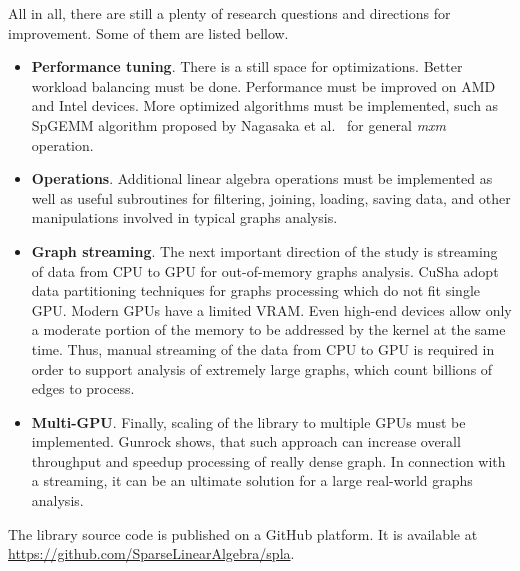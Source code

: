 All in all, there are still a plenty of research questions and directions for improvement. Some of them are listed bellow.

\begin{itemize}
    \item \textbf{Performance tuning}. There is a still space for optimizations. Better workload balancing must be done. Performance must be improved on AMD and Intel devices. More optimized algorithms must be implemented, such as SpGEMM  algorithm proposed by Nagasaka et al.~\cite{inproceedings:spgemm_mem_saving_for_nvidia} for general \textit{mxm} operation.
   
    \item \textbf{Operations}. Additional linear algebra operations must be implemented as well as useful subroutines for filtering, joining, loading, saving data, and other manipulations involved in typical graphs analysis.
    
    \item \textbf{Graph streaming}. The next important direction of the study is streaming of data from CPU to GPU for out-of-memory graphs analysis. CuSha adopt data partitioning techniques for graphs processing which do not fit single GPU. Modern GPUs have a limited VRAM. Even high-end devices allow only a moderate portion of the memory to be addressed by the kernel at the same time. Thus, manual streaming of the data from CPU to GPU is required in order to support analysis of extremely large graphs, which count billions of edges to process.
    
    \item \textbf{Multi-GPU}. Finally, scaling of the library to multiple GPUs must be implemented. Gunrock shows, that such approach can increase overall throughput and speedup processing of really dense graph. In connection with a streaming, it can be an ultimate solution for a large real-world graphs analysis.
\end{itemize}

The library source code is published on a GitHub platform. It is available at \url{https://github.com/SparseLinearAlgebra/spla}.
